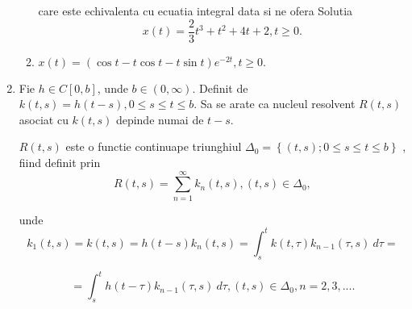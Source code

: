 \documentclass[a4paper,12pt,oneside]{report}
\begin{document}
\begin{enumerate}
\begin{enumerate}[label=(\alph*)]
		      		      care este echivalenta cu ecuatia integral data si ne ofera Solutia 
		      		      \begin{displaymath}
		      		      	x\left ( t \right ) = \frac{2}{3}t^{3} + t^{2} + 4t + 2, t\geq 0.
		      		      \end{displaymath}
		      		      		      		      		      		      		      		      		      		      
		      		      		      		      		      		      		      		      		      		      
		      		\item \(x\left ( t \right ) = \left ( \cos t - t\cos t - t\sin t  \right )e^{-2t}, t\geq  0.\)  
		      		      		      		      		      		      		      		      		      		      
		      		      		      		      		      		      		      		      		      		      
		      	\end{enumerate}
		      			      			      			      			      	
		      	\item Fie \(h \in C\left [ 0,b \right ]\), unde \(b \in \left ( 0,\infty  \right )\). Definit de  \(k\left ( t,s \right ) = h\left ( t-s \right ), 0\leq s \leq  t\leq b\). Sa se arate ca nucleul resolvent \(R\left ( t,s \right )\) asociat cu \(k\left ( t,s \right )\) depinde numai de \(t-s\). 
		      			      			      			      			      	
		      	\(R\left ( t,s \right )\) este o functie continuape triunghiul \(\Delta _{0} = \left \{ \left ( t,s \right );0\leq s\leq t\leq b \right \}\) , fiind definit prin 
		      	\begin{displaymath}
		      		R\left ( t,s \right ) = \sum_{n = 1}^{\infty }k_{n}\left ( t,s \right ), \left ( t,s \right )\in \Delta _{0},
		      	\end{displaymath}
		      			      			      			      			      	
		      	unde
		      	\begin{displaymath}
		      		k_{1}\left ( t,s \right ) = k\left ( t,s \right ) = h\left ( t-s \right )
		      		k_{n}\left ( t,s \right ) = \int_{s}^{t}k\left ( t,\tau  \right )k_{n-1}\left ( \tau ,s \right )\ d\tau  = 
		      	\end{displaymath}
		      			      			      			      			      	
		      	\begin{displaymath}
		      		= \int_{s}^{t} h\left ( t - \tau  \right )k_{n-1}\left ( \tau ,s \right ) \ d \tau , \left ( t,s \right ) \in \Delta _{0}, n = 2,3,.... 
		      	\end{displaymath}
		      			      			      			      			      	

\end{enumerate}
\end{document}
